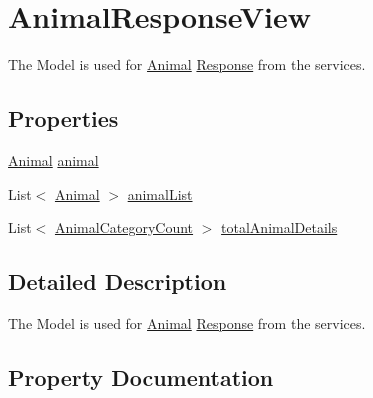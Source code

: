 \hypertarget{classWildlifeTrackingApp_1_1Models_1_1AnimalResponseView}{}\section{Animal\+Response\+View}
\label{classWildlifeTrackingApp_1_1Models_1_1AnimalResponseView}


The Model is used for \hyperlink{classWildlifeTrackingApp_1_1Models_1_1Animal}{Animal} \hyperlink{classWildlifeTrackingApp_1_1Models_1_1Response}{Response} from the services.  


\subsection*{Properties}
\begin{DoxyCompactItemize}
\item 
\hyperlink{classWildlifeTrackingApp_1_1Models_1_1Animal}{Animal} \hyperlink{classWildlifeTrackingApp_1_1Models_1_1AnimalResponseView_a364c7e4092980c5a9be7c56a2c810c18}{animal}
\item 
List$<$ \hyperlink{classWildlifeTrackingApp_1_1Models_1_1Animal}{Animal} $>$ \hyperlink{classWildlifeTrackingApp_1_1Models_1_1AnimalResponseView_a4c541d3fabb48f76436375ec172d1f8f}{animal\+List}
\item 
List$<$ \hyperlink{classWildlifeTrackingApp_1_1Models_1_1AnimalCategoryCount}{Animal\+Category\+Count} $>$ \hyperlink{classWildlifeTrackingApp_1_1Models_1_1AnimalResponseView_ac145fa4f68cbab144df205048ae7b752}{total\+Animal\+Details}
\end{DoxyCompactItemize}


\subsection{Detailed Description}
The Model is used for \hyperlink{classWildlifeTrackingApp_1_1Models_1_1Animal}{Animal} \hyperlink{classWildlifeTrackingApp_1_1Models_1_1Response}{Response} from the services. 



\subsection{Property Documentation}
\mbox{\label{classWildlifeTrackingApp_1_1Models_1_1AnimalResponseView_a364c7e4092980c5a9be7c56a2c810c18}} 
